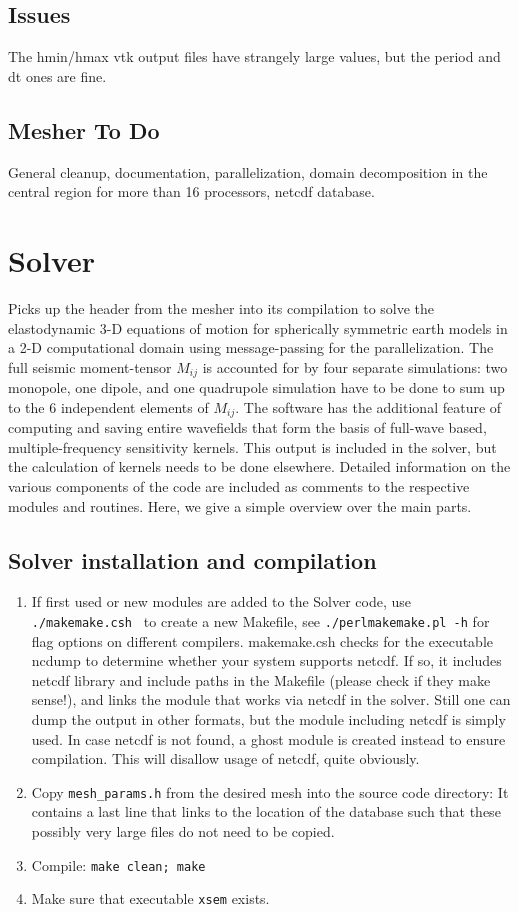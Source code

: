 \documentclass[11pt,letter,fleqn,english,notitlepage]{article}
\begin{document}
\subsection{Issues}
The hmin/hmax vtk output files have strangely large values, but the period and dt ones are fine.

\subsection{Mesher To Do}
General cleanup, documentation, parallelization, domain decomposition in the central region for 
more than 16 processors, netcdf database.

\newpage
\section{Solver}
Picks up the header from the mesher into its compilation to solve 
the elastodynamic 3-D equations of motion for spherically symmetric 
earth models in a 2-D computational domain using message-passing for the 
parallelization. The full seismic moment-tensor $M_{ij}$ is accounted for by four
separate simulations: two monopole, one dipole, and one quadrupole 
simulation have to be done to sum up to the 6 independent elements of $M_{ij}$.
The software has the additional feature of computing and 
saving entire wavefields that form the basis of full-wave based, 
multiple-frequency sensitivity kernels. This output is included in the 
solver, but the calculation of kernels needs to be done elsewhere. 
Detailed information on the various components of the code are included as 
comments to the respective modules and routines. 
Here, we give a simple overview over the main parts. 
\newpage
\subsection{Solver installation and compilation}
\begin{enumerate}
\item If first used or new modules are added to the Solver code,
use {\tt ./makemake.csh } to create a new Makefile, see {\tt ./perlmakemake.pl -h} for 
flag options on different compilers. makemake.csh checks for the
executable ncdump to determine whether your system supports netcdf. If
so, it includes netcdf library and include paths in the Makefile
(please check if they make sense!), and links the module that works
via netcdf in the solver. Still one can dump the output in other
formats, but the module including netcdf is simply used. In case
netcdf is not found, a ghost module is created instead to ensure
compilation. This will disallow usage of netcdf, quite obviously.
\item Copy {\tt mesh\_params.h} from the desired mesh into the source code directory: 
It contains a last line that links to the location of the database such that 
these possibly very large files do not need to be copied.
\item Compile: {\tt make clean; make}
\item Make sure that executable {\tt xsem} exists.
\end{enumerate}
\end{document}
